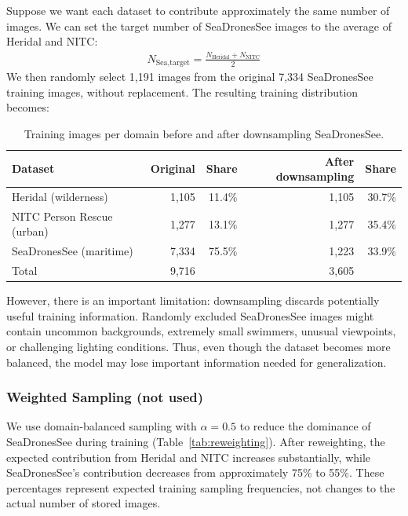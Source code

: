 \documentclass{article}
\begin{document}
Suppose we want each dataset to contribute approximately the same number of images. We can set the target number of SeaDronesSee images to the average of Heridal and NITC:
    \begin{align*}
    N_{\text{Sea,target}}=\frac{N_{\text{Heridal}}+N_{\text{NITC}}}{2}
    \end{align*}
    We then randomly select 1,191 images from the original 7,334 SeaDronesSee training images, without replacement. The resulting training distribution becomes:
 
\begin{table}[h]
  \caption{Training images per domain before and after downsampling SeaDronesSee.}
  \label{tab:downsample}
  \centering
  \small
  \begin{tabular}{lrrrr}
    \toprule
    Dataset & Original & Share & After downsampling & Share \\
    \midrule
    Heridal (wilderness) & 1,105 & 11.4\% & 1,105 & 30.7\% \\
    NITC Person Rescue (urban) & 1,277 & 13.1\% & 1,277 & 35.4\% \\
    SeaDronesSee (maritime) & 7,334 & 75.5\% & 1,223 & 33.9\% \\
    \midrule
    Total & 9,716 & & 3,605 & \\
    \bottomrule
  \end{tabular}
\end{table}

However, there is an important limitation: downsampling discards potentially useful training information. Randomly excluded SeaDronesSee images might contain uncommon backgrounds, extremely small swimmers, unusual viewpoints, or challenging lighting conditions. Thus, even though the dataset becomes more balanced, the model may lose important information needed for generalization.\\
 
\subsubsection{Weighted Sampling (not used)}
We use domain-balanced sampling with \(\alpha=0.5\) to reduce the dominance of SeaDronesSee during training (Table~\ref{tab:reweighting}). After reweighting, the expected contribution from Heridal and NITC increases substantially, while SeaDronesSee's contribution decreases from approximately 75\% to 55\%. These percentages represent expected training sampling frequencies, not changes to the actual number of stored images.\\
\end{document}
